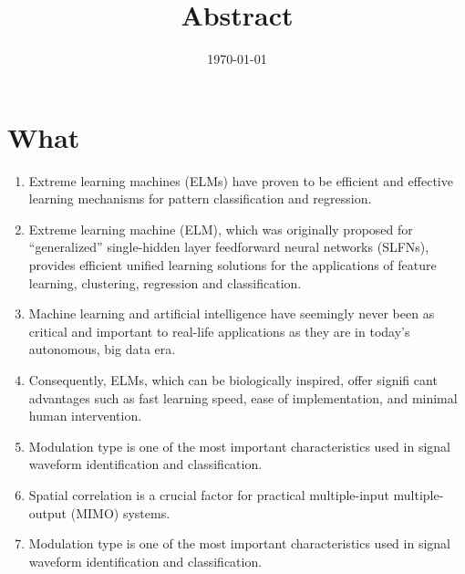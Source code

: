 \documentclass[onecolumn,conference]{IEEEtran}
\begin{document}
\title{Abstract}
\author{\today}
\maketitle
\section{What}
\begin{enumerate}
\item Extreme learning machines (ELMs) have proven to be efficient and effective learning mechanisms for pattern classification and regression. \cite{Huang2014}
\item Extreme learning machine (ELM), which was originally proposed for “generalized” single-hidden layer feedforward neural networks (SLFNs), provides efficient unified learning solutions for the applications of feature learning, clustering, regression and classification. \cite{Huang2015} \item Machine learning and artificial intelligence have seemingly never been as critical and important to real-life applications as they are in today’s autonomous, big data era.\cite{Kasun2013}
\item Consequently, ELMs, which can be biologically inspired, offer signifi cant advantages such as fast learning speed, ease of implementation, and minimal human intervention.\cite{Kasun2013}
\item Modulation type is one of the most important characteristics used in signal waveform identification and classification. \cite{HassanFebruary2012}
\item Spatial correlation is a crucial factor for practical multiple-input multiple-output (MIMO) systems. \cite{HassanFebruary2012}
\item Modulation type is one of the most important characteristics used in signal waveform identification and classification. \cite{HassanFebruary2012}
\end{enumerate}
\end{document}
